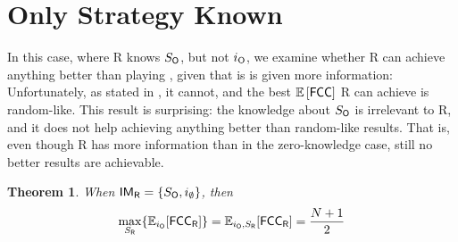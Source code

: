 \documentclass[a4paper,11pt]{article}
\newtheorem{theorem}{Theorem}
\theoremstyle{definition}
\newcommand{\rob}{{{\sf R}}\xspace}
\newcommand{\opp}{{{\sf O}}\xspace}
\newcommand{\fcc}{{{\sf{FCC}}}\xspace}
\newcommand{\IM}{{{\sf{IM}}}\xspace}
\newcommand{\crs}{{{\sf{CRS}}}\xspace}
\begin{document}
\section{Only Strategy Known} 

In this case, where \rob knows $S_\opp$, but not $i_\opp$, we examine whether \rob can achieve anything better than playing \crs, given that is is given more information: Unfortunately, as stated in , it cannot, and the best $\mathbb{E}\left[\fcc\right]$ \rob can achieve is random-like.
This result is surprising: the knowledge about $S_\opp$ is irrelevant to \rob, and it does not help achieving anything better than random-like results. That is, even though \rob has more information than in the zero-knowledge case, still no better results are achievable.

\begin{theorem}\label{theorems: 2d max fcc unknown io}
When $\IM_\rob=\lbrace S_\opp , i_\emptyset \rbrace$, then 
\[\max_{S_\rob} \lbrace \mathbb{E}_{i_\opp}[\fcc_\rob]\rbrace=\mathbb{E}_{i_\opp,S_\rob}[\fcc_\rob]=\frac{N+1}{2}\]
\end{theorem}
\end{document}
